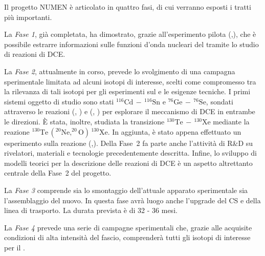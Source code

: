 Il progetto NUMEN è articolato in quattro fasi, di cui verranno esposti i tratti più importanti. 

La \emph{Fase 1}, già completata, ha dimostrato, grazie all'esperimento pilota (,), che è possibile estrarre informazioni sulle funzioni d'onda nucleari del \doppiobeta{} tramite lo studio di reazioni di DCE.

La \emph{Fase 2}, attualmente in corso, prevede lo svolgimento di una campagna sperimentale limitata ad alcuni isotopi di interesse, scelti come compromesso tra la rilevanza di tali isotopi per gli esperimenti sul \doppiobeta{} e le esigenze tecniche. I primi sistemi oggetto di studio sono stati $^{116}\mbox{Cd}\,  - \, ^{116}\mbox{Sn} $ e $^{76}\mbox{Ge}\,  - \, ^{76}\mbox{Se} $, sondati attraverso le reazioni (, ) e (, ) per esplorare il meccanismo di DCE in entrambe le direzioni. 
È stata, inoltre, studiata la transizione $^{130}\mbox{Te}\,  - \, ^{130}\mbox{Xe} $ mediante la reazione $^{130}\mbox{Te}\,  ( ^{20}\mbox{Ne}, ^{20}\mbox{O} ) \, ^{130}\mbox{Xe} $.
In aggiunta, è stato appena effettuato un esperimento sulla reazione (,). 
Della Fase~2 fa parte anche l'attività di R\&D su rivelatori, materiali e tecnologie precedentemente descritta.
Infine, lo sviluppo di modelli teorici per la descrizione delle reazioni di DCE è un aspetto altrettanto centrale della Fase~2 del progetto.

La \emph{Fase 3} comprende sia lo smontaggio dell'attuale apparato sperimentale sia l'assemblaggio del nuovo. In questa fase avrà luogo anche l'upgrade del CS e della linea di trasporto. La durata prevista è di 32 - 36 mesi.


La \emph{Fase 4} prevede una serie di campagne sperimentali che, grazie alle acquisite condizioni di alta intensità del fascio, comprenderà tutti gli isotopi di interesse per il \doppiobeta{}. 










\clearpage
